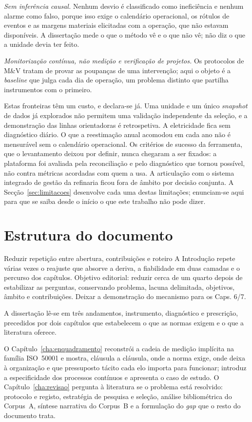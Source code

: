 \emph{Sem inferência causal.} Nenhum desvio é classificado como
ineficiência e nenhum alarme como falso, porque isso exige o calendário
operacional, os rótulos de eventos e as margens materiais elicitadas
com a operação, que não estavam disponíveis. A dissertação mede o que o
método vê e o que não vê; não diz o que a unidade devia ter feito.

\emph{Monitorização contínua, não medição e verificação de projetos.}
Os protocolos de M\&V tratam de provar as poupanças de uma intervenção;
aqui o objeto é a \emph{baseline} que julga cada dia de operação, um
problema distinto que partilha instrumentos com o primeiro.

Estas fronteiras têm um custo, e declara-se já. Uma unidade e um único
\emph{snapshot} de dados já explorados não permitem uma validação
independente da seleção, e a demonstração das linhas orientadoras é
retrospetiva. A
eletricidade fica sem diagnóstico diário. O que a reestimação anual
acomodou em cada ano não é mensurável sem o calendário operacional. Os
critérios de sucesso da ferramenta, que o levantamento deixou por
definir, nunca chegaram a ser fixados: a plataforma foi avaliada pela
reconciliação e pelo diagnóstico que tornou possível, não contra
métricas acordadas com quem a usa. A articulação com o sistema integrado
de gestão da refinaria ficou fora de âmbito por decisão conjunta. A
Secção~\ref{sec:limitacoes} desenvolve cada uma destas limitações;
enunciam-se aqui para que se saiba desde o início o que este trabalho
não pode dizer.

\section{Estrutura do documento}
\label{sec:estrutura}
{Reduzir repetição entre abertura, contribuições e roteiro}
{A Introdução repete várias vezes o reajuste que absorve a deriva, a
fiabilidade em duas camadas e o percurso dos capítulos. Objetivo editorial:
reduzir cerca de um quarto depois de estabilizar as perguntas, conservando
problema, lacuna delimitada, objetivos, âmbito e contribuições.
Deixar a demonstração do mecanismo para os Caps. 6/7.}%

A dissertação lê-se em três andamentos, instrumento, diagnóstico e
prescrição, precedidos por dois capítulos que estabelecem o que as
normas exigem e o que a literatura oferece.

O Capítulo~\ref{cha:enquadramento} reconstrói a cadeia de medição
implícita na família ISO~50001 e mostra, cláusula a cláusula, onde a
norma exige, onde deixa à organização e que pressuposto tácito cada elo
importa para funcionar; introduz a especificidade dos processos
contínuos e apresenta o caso de estudo. O Capítulo~\ref{cha:revisao}
pergunta à literatura se o problema está resolvido: protocolo e
registo, estratégia de pesquisa e seleção, análise bibliométrica do
Corpus~A, síntese narrativa do Corpus~B e a formulação do \emph{gap}
que o resto do documento trata.

